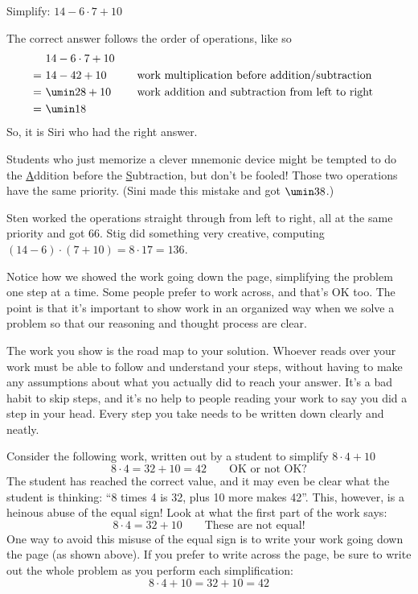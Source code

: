 \begin{boxedex}
Simplify: $14 - 6 \cdot 7 + 10$

\exsoln{} The correct answer follows the order of operations, like so
\[\begin{aligned}
	&~ 14 - 6 \cdot 7 + 10\\
=	&~ 14 - 42 + 10
&& \quad\text{work multiplication before addition/subtraction}\\
=	&~ \umin28 + 10
&& \quad\text{work addition and subtraction from left to right}\\
=	&~ \umin18
\end{aligned}\]
So, it is Siri who had the right answer.

Students who just memorize a clever mnemonic device might be tempted to do the \underline{A}ddition before the \underline{S}ubtraction, but don't be fooled! Those two operations have the same priority. (Sini made this mistake and got $\umin38$.)

Sten worked the operations straight through from left to right, all at the same priority and got 66. Stig did something very creative, computing $(14-6)\cdot(7+10) = 8 \cdot 17 = 136$.
\end{boxedex}

Notice how we showed the work going down the page, simplifying the problem one step at a time. Some people prefer to work across, and that's OK too. The point is that it's important to show work in an organized way when we solve a problem so that our reasoning and thought process are clear.


The work you show is the road map to your solution. Whoever reads over your work must be able to follow and understand your steps, without having to make any assumptions about what you actually did to reach your answer. It's a bad habit to skip steps, and it's no help to people reading your work to say you did a step in your head. Every step you take needs to be written down clearly and neatly.

\begin{boxedwarning}
Consider the following work, written out by a student to simplify $8 \cdot 4 + 10$ \[8 \cdot 4 = 32 + 10 = 42 \qquad\text{OK or not OK?}\]
The student has reached the correct value, and it may even be clear what the student is thinking: ``8 times 4 is 32, plus 10 more makes 42''. This, however, is a heinous abuse of the equal sign! Look at what the first part of the work says: \[8 \cdot 4 = 32 + 10 \qquad\text{These are not equal!}\]
One way to avoid this misuse of the equal sign is to write your work going down the page (as shown above). If you prefer to write across the page, be sure to write out the whole problem as you perform each simplification: \[8 \cdot 4 + 10 = 32 + 10 = 42\]
\end{boxedwarning}

